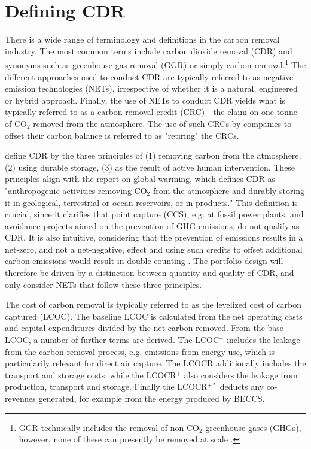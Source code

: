 \section{Defining CDR}
There is a wide range of terminology and definitions in the carbon removal industry. The most common terms include carbon dioxide removal (CDR) and synonyms such as greenhouse gas removal (GGR) or simply carbon removal.\footnote{GGR technically includes the removal of non-CO$_2$ greenhouse gases (GHGs), however, none of these can presently be removed at scale \parencite{net_zero_climate_greenhouse_nodate}.} The different approaches used to conduct CDR are typically referred to as negative emission technologies (NETs), irrespective of whether it is a natural, engineered or hybrid approach. Finally, the use of NETs to conduct CDR yields what is typically referred to as a carbon removal credit (CRC) - the claim on one tonne of CO$_2$ removed from the atmosphere. The use of such CRCs by companies to offset their carbon balance is referred to as "retiring" the CRCs.\vspace{2mm}

\textcite{smith_state_2024} define CDR by the three principles of (1) removing carbon from the atmosphere, (2) using durable storage, (3) as the result of active human intervention. These principles align with the \textcite{ipcc_global_2019} report on global warming, which defines CDR as "anthropogenic activities removing CO$_2$ from the atmosphere and durably storing it in geological, terrestrial or ocean reservoirs, or in products." This definition is crucial, since it clarifies that point capture (CCS), e.g. at fossil power plants, and avoidance projects aimed on the prevention of GHG emissions, do not qualify as CDR. It is also intuitive, considering that the prevention of emissions results in a net-zero, and not a net-negative, effect and using such credits to offset additional carbon emissions would result in double-counting \parencite{reichelstein_accounting_2024}. The portfolio design will therefore be driven by a distinction between quantity and quality of CDR, and only consider NETs that follow these three principles.\vspace{2mm}

The cost of carbon removal is typically referred to as the levelized cost of carbon captured (LCOC). The baseline LCOC is calculated from the net operating costs and capital expenditures divided by the net carbon removed. From the base LCOC, a number of further terms are derived. The LCOC$^+$ includes the leakage from the carbon removal process, e.g. emissions from energy use, which is particularily relevant for direct air capture. The LCOCR additionally includes the transport and storage costs, while the LCOCR$^+$ also considers the leakage from production, transport and storage. Finally the LCOCR$^{+*}$ deducts any co-revenues generated, for example from the energy produced by BECCS.

